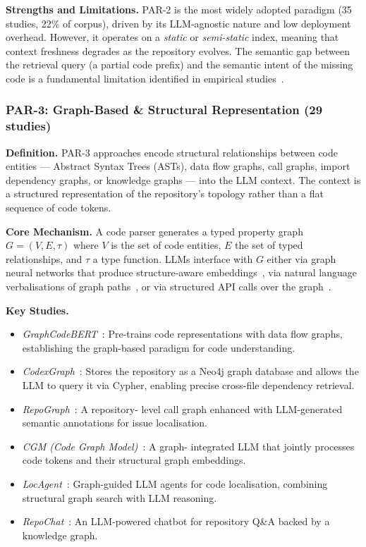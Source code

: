 \documentclass[acmsmall,screen,review]{acmart}
\begin{document}
\textbf{Strengths and Limitations.}
PAR-2 is the most widely adopted paradigm (35 studies, 22\% of corpus),
driven by its LLM-agnostic nature and low deployment overhead. However,
it operates on a \emph{static} or \emph{semi-static} index, meaning
that context freshness degrades as the repository evolves. The
semantic gap between the retrieval query (a partial code prefix) and
the semantic intent of the missing code is a fundamental limitation
identified in empirical
studies~\cite{Yang2025EmpiricalRAG, Gu2025WhatRetrieve}.

\subsubsection{PAR-3: Graph-Based \& Structural Representation
  (29 studies)}
\label{subsubsec:par3}

\textbf{Definition.} PAR-3 approaches encode structural relationships
between code entities — Abstract Syntax Trees (ASTs), data flow
graphs, call graphs, import dependency graphs, or knowledge graphs —
into the LLM context. The context is a structured representation of
the repository's topology rather than a flat sequence of code tokens.

\textbf{Core Mechanism.} A code parser generates a typed property graph
$G = (V, E, \tau)$ where $V$ is the set of code entities, $E$ the set
of typed relationships, and $\tau$ a type function. LLMs interface
with $G$ either via graph neural networks that produce
structure-aware
embeddings~\cite{Guo2021GraphCodeBERT, Liu2024GraphCoder}, via natural
language verbalisations of graph paths~\cite{Liu2025CodexGraph}, or via
structured API calls over the
graph~\cite{Zhang2024ACR, Ouyang2025RepoGraph}.

\textbf{Key Studies.}
\begin{itemize}
  \item \textit{GraphCodeBERT}~\cite{Guo2021GraphCodeBERT}: Pre-trains
    code representations with data flow graphs, establishing the
    graph-based paradigm for code understanding.
  \item \textit{CodexGraph}~\cite{Liu2025CodexGraph}: Stores the
    repository as a Neo4j graph database and allows the LLM to query
    it via Cypher, enabling precise cross-file dependency retrieval.
  \item \textit{RepoGraph}~\cite{Ouyang2025RepoGraph}: A repository-
    level call graph enhanced with LLM-generated semantic annotations
    for issue localisation.
  \item \textit{CGM (Code Graph Model)}~\cite{Tao2025CGM}: A graph-
    integrated LLM that jointly processes code tokens and their
    structural graph embeddings.
  \item \textit{LocAgent}~\cite{Chen2025LocAgent}: Graph-guided LLM
    agents for code localisation, combining structural graph search with
    LLM reasoning.
  \item \textit{RepoChat}~\cite{Abedu2025RepoChat}: An LLM-powered
    chatbot for repository Q\&A backed by a knowledge graph.
\end{itemize}
\end{document}
